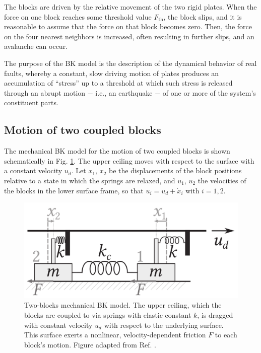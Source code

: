 The blocks are driven by the relative movement of the two rigid plates. When the force on one block
reaches some threshold value $F_{\text{th}}$, the block slips, and it is reasonable to assume that the
force on that block becomes zero. Then, the force on the four nearest neighbors is increased, often
resulting in further slips, and an avalanche can occur.

The purpose of the BK model is the description of the dynamical behavior of
real faults, whereby a constant, slow driving motion of plates produces an accumulation of ``stress''
up to a threshold at which such stress is released through an abrupt motion $-$ i.e., an earthquake $-$
of one or more of the system's constituent parts.

\subsection{Motion of two coupled blocks}
\label{subsec: diff eqs for two blocks}

The mechanical BK model for the motion of two coupled blocks is shown schematically in
Fig. \ref{fig: 2 blocks motion}. The upper ceiling moves with respect to the surface with
a constant velocity $u_d$. Let $x_1$, $x_2$ be the displacements of the block positions
relative to a state in which the springs are relaxed, and $u_1$, $u_2$ the velocities of the blocks in the
lower surface frame, so that $u_i=u_d+\dot{x}_i$ with $i=1,2$.

\begin{figure}[H]
    \centering
    \includegraphics[width=0.5\linewidth]{images/bk_2_blocks.png}
    \caption{Two-blocks mechanical BK model. The upper ceiling, which the blocks
    are coupled to via springs with elastic constant $k$, is dragged with constant
    velocity $u_d$ with respect to the underlying surface. This surface exerts a nonlinear,
    velocity-dependent friction $F$ to each block's motion. Figure adapted from Ref. \cite{ref:electronic_analog}.}
    \label{fig: 2 blocks motion}
\end{figure}

